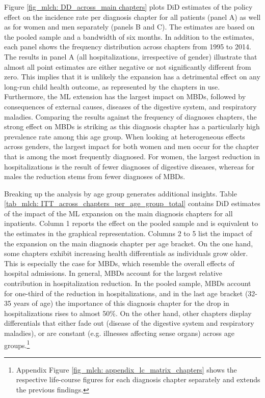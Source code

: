 Figure \ref{fig_mlch: DD_across_main chapters} plots DiD estimates of the policy effect on the incidence rate per diagnosis chapter for all patients (panel A) as well as for women and men separately (panels B and C). The estimates are based on the pooled sample and a bandwidth of six months. In addition to the estimates, each panel shows the frequency distribution across chapters from 1995 to 2014. The results in panel A (all hospitalizations, irrespective of gender) illustrate that almost all point estimates are either negative or not significantly different from zero. This implies that it is unlikely the expansion has a detrimental effect on any long-run child health outcome, as represented by the chapters in use. Furthermore, the ML extension has the largest impact on MBDs, followed by consequences of external causes, diseases of the digestive system, and respiratory maladies. Comparing the results against the frequency of diagnoses chapters, the strong effect on MBDs is striking as this diagnosis chapter has a particularly high prevalence rate among this age group. When looking at heterogeneous effects across genders, the largest impact for both women and men occur for the chapter that is among the most frequently diagnosed. For women, the largest reduction in hospitalizations is the result of fewer diagnoses of digestive diseases, whereas for males the reduction stems from fewer diagnoses of MBDs. 





Breaking up the analysis by age group generates additional insights. Table \ref{tab_mlch: ITT_across_chapters_per_age_group_total} contains DiD estimates of the impact of the ML expansion on the main diagnosis chapters for all inpatients. Column 1 reports the effect on the pooled sample and is equivalent to the estimates in the graphical representation. Columns 2 to 5 list the impact of the expansion on the main diagnosis chapter per age bracket. On the one hand, some chapters exhibit increasing health differentials as individuals grow older. This is especially the case for MBDs, which resemble the overall effects of hospital admissions. In general, MBDs account for the largest relative contribution in hospitalization reduction. In the pooled sample, MBDs account for one-third of the reduction in hospitalizations, and in the last age bracket (32-35 years of age) the importance of this diagnosis chapter for the drop in hospitalizations rises to almost 50\%. On the other hand, other chapters display differentials that either fade out (disease of the digestive system and respiratory maladies), or are constant (e.g. illnesses affecting sense organs) across age groups.\footnote{Appendix Figure \ref{fig_mlch: appendix_lc_matrix_chapters} shows the respective life-course figures for each diagnosis chapter separately and extends the previous findings.} 




